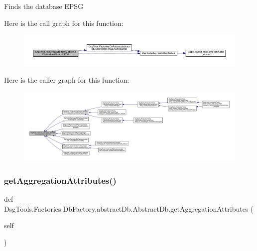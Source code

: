\begin{DoxyVerb}Finds the database EPSG
\end{DoxyVerb}
 Here is the call graph for this function\+:
\nopagebreak
\begin{figure}[H]
\begin{center}
\leavevmode
\includegraphics[width=350pt]{class_dsg_tools_1_1_factories_1_1_db_factory_1_1abstract_db_1_1_abstract_db_a757b802e1e162e035b7083af89959575_cgraph}
\end{center}
\end{figure}
Here is the caller graph for this function\+:
\nopagebreak
\begin{figure}[H]
\begin{center}
\leavevmode
\includegraphics[width=350pt]{class_dsg_tools_1_1_factories_1_1_db_factory_1_1abstract_db_1_1_abstract_db_a757b802e1e162e035b7083af89959575_icgraph}
\end{center}
\end{figure}
\mbox{\label{class_dsg_tools_1_1_factories_1_1_db_factory_1_1abstract_db_1_1_abstract_db_a3def3982594ab83c828bf0b6dce42ce6}} 
\subsubsection{\texorpdfstring{get\+Aggregation\+Attributes()}{getAggregationAttributes()}}
{\footnotesize\ttfamily def Dsg\+Tools.\+Factories.\+Db\+Factory.\+abstract\+Db.\+Abstract\+Db.\+get\+Aggregation\+Attributes (\begin{DoxyParamCaption}\item[{}]{self }\end{DoxyParamCaption})}

